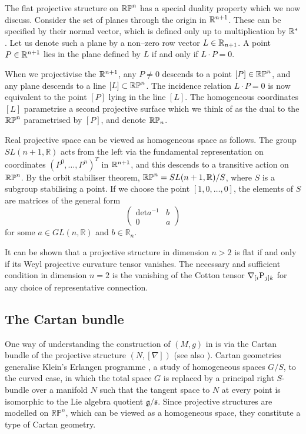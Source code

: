 The flat projective structure on $\mathbb{RP}^n$ has a special duality property which we now discuss. Consider the set of planes through the origin in $\mathbb{R}^{n+1}$. These can be specified by their normal vector, which is defined only up to multiplication by $\mathbb{R}^*$. Let us denote such a plane by a non--zero row vector $L\in\mathbb{R}_{n+1}$. A point $P\in\mathbb{R}^{n+1}$ lies in the plane defined by $L$ if and only if $L\cdot P=0$.

When we projectivise the $\mathbb{R}^{n+1}$, any $P\neq 0$ descends to a point $[P]\in\mathbb{RP}^n$, and any plane descends to a line $[L]\subset\mathbb{RP}^n$. The incidence relation $L\cdot P=0$ is now equivalent to the point $[P]$ lying in the line $[L]$. The homogeneous coordinates $[L]$ parametrise a second projective surface which we think of as the dual to the $\mathbb{RP}^n$ parametrised by $[P]$, and denote $\mathbb{RP}_n$.

Real projective space can be viewed as homogeneous space as follows. 
The group $SL(n+1,\mathbb{R})$ acts from the left via the fundamental representation on coordinates $(P^0,\dots,P^n)^T$ in $\mathbb{R}^{n+1}$, and this descends to a transitive action on $\mathbb{RP}^n$. By the orbit stabiliser theorem, $\mathbb{RP}^n=SL(n+1,\mathbb{R})/S$, where $S$ is a subgroup stabilising a point. If we choose the point $[1,0,\dots,0]$, the elements of $S$ are matrices of the general form
\[
\begin{pmatrix}\mathrm{det}a^{-1} & b\\
0 & a
\end{pmatrix}
\]
for some $a\in GL(n,\mathbb{R})$ and $b\in\mathbb{R}_{n}$. 

It can be shown that a projective structure in dimension $n>2$ is flat if and only if its Weyl projective curvature tensor vanishes. The necessary and sufficient condition in dimension $n=2$ is the vanishing of the Cotton tensor $\nabla_{[i}\mathrm{P}_{j]k}$ for any choice of representative connection.

\subsection{The Cartan bundle}

One way of understanding the construction of $(M,g)$ in \cite{DM}
is via the Cartan bundle \cite{Cartan} of the projective structure $(N,[\nabla])$ (see also \cite{KobNag}). Cartan geometries generalise Klein's Erlangen programme \cite{Klein}, a study of homogeneous spaces $G/S$, to the curved case, in which the total space $G$ is replaced by a principal right $S$-bundle over a manifold $N$ such that the tangent space to $N$ at every point is isomorphic to the Lie algebra quotient $\mathfrak{g}/\mathfrak{s}$. Since projective structures are modelled on $\mathbb{RP}^{n}$, which can be viewed as a homogeneous space, they constitute a type of Cartan geometry.

